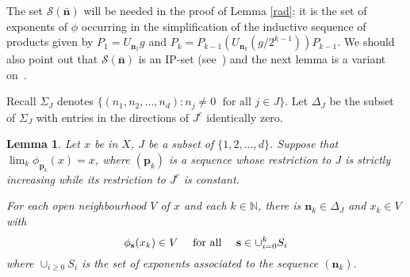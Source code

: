 \documentclass[12pt]{amsart}
\newtheorem{lemma}[theorem]{Lemma}
\theoremstyle{definition}
\newcommand{\mcS}{\mathcal{S}}
\newcommand{\bo}[1]{\mathbf{#1}}
\newcommand{\bon}{\mathbf{n}}
\begin{document}
The set $\mcS(\bar{\bon})$ will be needed in the
proof of Lemma \ref{rad}: it is the set of exponents of
$\phi$ occurring in the simplification of the inductive
sequence of products given by $P_1=U_{\bon_1} g$ and
$P_{k} = P_{k-1}(U_{\bon_{k}} (g/2^{k-1}) ) P_{k-1}$.
We should also point out that $\mcS(\bar{\bon})$ is
an IP-set (see~\cite[Section~8.4]{Furstenberg81}) and the next
lemma is a variant on~\cite[Theorem~2.17]{Furstenberg81}.

Recall $\Sigma_J$ denotes $\{(n_1,n_2,\ldots,n_{d}): n_{j}\neq0 \;
\mbox{ for all } j \in J \}$.
Let $\Delta_J$ be the subset of $\Sigma_J$ with entries
in the directions of $J^c$ identically zero.

\begin{lemma} \label{rec}
Let $x$ be in $X$, $J$ be a subset of $\{1,2,\ldots,d\}$.
Suppose that $\lim_{k}\phi_{\bo{p}_{k}}(x)=x$, where $(\bo{p}_{k})$
is a sequence whose restriction to $J$ is strictly increasing while its
restriction to $J^{c}$ is constant.

For each open neighbourhood $V$ of $x$ and each $k\in \mathbb{N}$,
there is $\bo{n}_{k}\in \Delta _{J}$ and $x_{k}\in V$ with
\[
\phi _{\mathbf{s}}(x_{k})\in V\quad \hbox{ for all }\quad
\mathbf{s}\in \cup _{i=0}^{k}S_{i}
\]
where $\cup _{i\geq 0}S_{i}$ is the set of exponents associated to
the sequence $(\mathbf{n}_{k})$.
\end{lemma}
\end{document}
